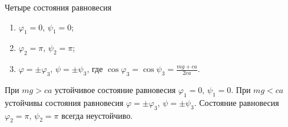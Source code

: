 Четыре состояния равновесия
\begin{enumerate}
\item $\varphi _1 = 0$, $\psi _1 = 0$;
\item $\varphi _2 = \pi$, $\psi _2 = \pi$;
\item $\varphi = \pm\varphi _3$, $\psi = \pm \psi _3$,
где $\cos{\varphi _3} = \cos{\psi _3} = \frac{mg + ca}{2ca}$.
\end{enumerate}
При $mg > ca$ устойчивое состояние равновесия $\varphi _1 = 0$, $\psi _1 = 0$.
При $mg < ca$ устойчивы состояния равновесия
$\varphi = \pm\varphi _3$, $\psi = \pm \psi _3$.
Состояние равновесия $\varphi _2 = \pi$, $\psi _2 = \pi$
всегда неустойчиво.
